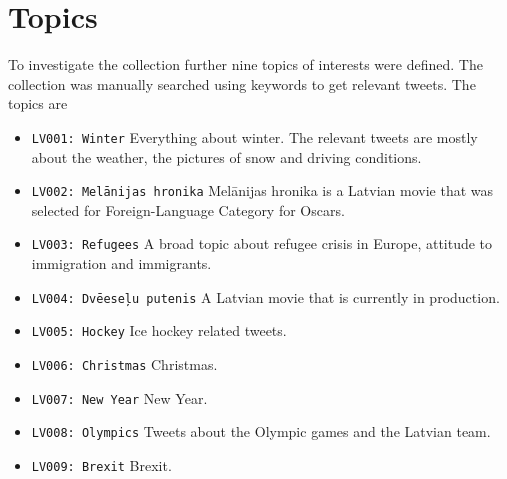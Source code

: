 \documentclass{IOS-Book-Article}
\begin{document}
\section{Topics}
\label{sec:topics}

To investigate the collection further nine topics of interests were defined. The collection was manually searched using keywords to get relevant tweets. The topics are
\begin{itemize}
\item \texttt{LV001: Winter} Everything about winter. The relevant tweets are mostly about the weather, the pictures of snow and driving conditions.
\item \texttt{LV002: Mel\=anijas hronika} Mel\=anijas hronika is a Latvian movie that was selected for Foreign-Language Category for Oscars.
\item \texttt{LV003: Refugees} A broad topic about refugee crisis in Europe, attitude to immigration and immigrants.
\item \texttt{LV004: Dv\=eese\c{l}u putenis} A Latvian movie that is currently in production.
\item \texttt{LV005: Hockey} Ice hockey related tweets.
\item \texttt{LV006: Christmas} Christmas.
\item \texttt{LV007: New Year} New Year.
\item \texttt{LV008: Olympics} Tweets about the Olympic games and the Latvian team.
\item \texttt{LV009: Brexit} Brexit.
\end{itemize}








\end{document}
